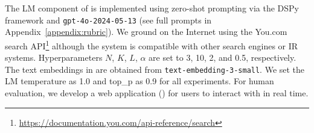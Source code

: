 









The LM component of \system is implemented using zero-shot prompting via the DSPy framework \citep{khattab2023dspy} and \texttt{gpt-4o-2024-05-13} (see full prompts in Appendix~\ref{appendix:rubric}). We ground \system on the Internet using the You.com search API\footnote{\url{https://documentation.you.com/api-reference/search}} although the system is compatible with other search engines or IR systems. Hyperparameters $N$, $K$, $L$, $\alpha$ are set to 3, 10, 2, and 0.5, respectively. The text embeddings in  are obtained from \texttt{text-embedding-3-small}. We set the LM temperature as 1.0 and top\_p as 0.9 for all experiments. For human evaluation, we develop a web application () for users to interact with \system in real time.